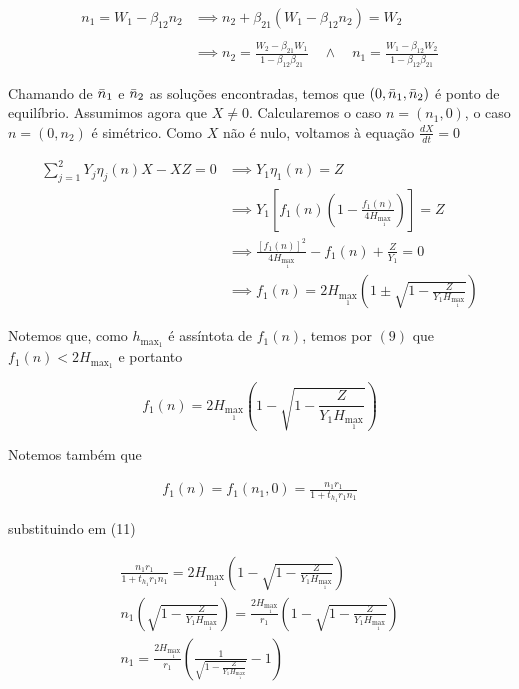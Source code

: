 \documentclass{article}
\begin{document}
\begin{align*}
    n_1 = W_1 - \beta_{12}n_2 &\implies n_2 + \beta_{21}(W_1 - \beta_{12}n_2) = W_2 \\\\
    &\implies n_2 = \frac{W_2 - \beta_{21}W_1}{1 - \beta_{12}\beta_{21}} \quad \land \quad n_1 = \frac{W_1 - \beta_{12}W_2}{1 - \beta_{12}\beta_{21}}
\end{align*}

Chamando de $\Bar{n}_1$ e $\Bar{n}_2$ as soluções encontradas, temos que $(0,\Bar{n}_1,\Bar{n}_2)$ é ponto de equilíbrio. Assumimos agora que $X \neq 0$. Calcularemos o caso $n = (n_1,0)$, o caso $n = (0,n_2)$ é simétrico. Como $X$ não é nulo, voltamos à equação $\frac{dX}{dt} = 0$

\begin{align}
    \sum_{j=1}^2 Y_j\eta_j(n)X - XZ = 0 &\implies Y_1\eta_1(n) = Z \\
                                        &\implies Y_1\left[f_1(n)\left(1 - \frac{f_1(n)}{4H_{\max_1}}\right)\right] = Z \nonumber \\
                                        &\implies \frac{[f_1(n)]^2}{4H_{\max_1}} - f_1(n) + \frac{Z}{Y_1} = 0 \nonumber \\
                                        &\implies f_1(n) = 2H_{\max_1}\left(1 \pm \sqrt{1 - \frac{Z}{Y_1H_{\max_1}}} \right) \nonumber
\end{align}


Notemos que, como $h_{\max_1}$ é assíntota de $f_1(n)$, temos por $(9)$ que \linebreak $f_1(n) < 2H_{\max_1}$ e portanto

\begin{equation}
    f_1(n) = 2H_{\max_1}\left(1 - \sqrt{1 - \frac{Z}{Y_1H_{\max_1}}} \right)
\end{equation}

Notemos também que

\begin{align*}
    f_1(n) = f_1(n_1,0) = \frac{n_1r_1}{1 + t_{h_1}r_1n_1}
\end{align*}

substituindo em (11)

\begin{align*}
    \frac{n_1r_1}{1 + t_{h_1}r_1n_1} = 2H_{\max_1}\left(1 - \sqrt{1 - \frac{Z}{Y_1H_{\max_1}}} \right) \\
    n_1\left( \sqrt{1 - \frac{Z}{Y_1H_{\max_1}}} \right) = \frac{2H_{\max_1}}{r_1}\left(1 - \sqrt{1 - \frac{Z}{Y_1H_{\max_1}}} \right) \\
    n_1 = \frac{2H_{\max_1}}{r_1}\left( \frac{1}{\sqrt{1 - \frac{Z}{Y_1H_{\max_1}}}} - 1 \right)
\end{align*}
\end{document}
